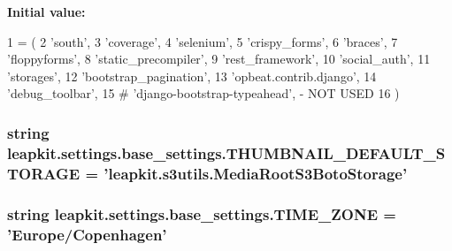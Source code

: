{\bfseries Initial value\-:}
\begin{DoxyCode}
1 = (
2     \textcolor{stringliteral}{'south'},
3     \textcolor{stringliteral}{'coverage'},
4     \textcolor{stringliteral}{'selenium'},
5     \textcolor{stringliteral}{'crispy\_forms'},
6     \textcolor{stringliteral}{'braces'},
7     \textcolor{stringliteral}{'floppyforms'},
8     \textcolor{stringliteral}{'static\_precompiler'},
9     \textcolor{stringliteral}{'rest\_framework'},
10     \textcolor{stringliteral}{'social\_auth'},
11     \textcolor{stringliteral}{'storages'},
12     \textcolor{stringliteral}{'bootstrap\_pagination'},
13     \textcolor{stringliteral}{'opbeat.contrib.django'},
14     \textcolor{stringliteral}{'debug\_toolbar'},
15     \textcolor{comment}{# 'django-bootstrap-typeahead', - NOT USED}
16 )
\end{DoxyCode}
\hypertarget{namespaceleapkit_1_1settings_1_1base__settings_a2e36f272241c43edf18996e98f8b95ec}{
\subsubsection[{T\-H\-U\-M\-B\-N\-A\-I\-L\-\_\-\-D\-E\-F\-A\-U\-L\-T\-\_\-\-S\-T\-O\-R\-A\-G\-E}]{\setlength{\rightskip}{0pt plus 5cm}string leapkit.\-settings.\-base\-\_\-settings.\-T\-H\-U\-M\-B\-N\-A\-I\-L\-\_\-\-D\-E\-F\-A\-U\-L\-T\-\_\-\-S\-T\-O\-R\-A\-G\-E = 'leapkit.\-s3utils.\-Media\-Root\-S3\-Boto\-Storage'}}\label{namespaceleapkit_1_1settings_1_1base__settings_a2e36f272241c43edf18996e98f8b95ec}
\hypertarget{namespaceleapkit_1_1settings_1_1base__settings_a95e11624d7557f88efa03e70af4d617c}{
\subsubsection[{T\-I\-M\-E\-\_\-\-Z\-O\-N\-E}]{\setlength{\rightskip}{0pt plus 5cm}string leapkit.\-settings.\-base\-\_\-settings.\-T\-I\-M\-E\-\_\-\-Z\-O\-N\-E = 'Europe/Copenhagen'}}\label{namespaceleapkit_1_1settings_1_1base__settings_a95e11624d7557f88efa03e70af4d617c}
